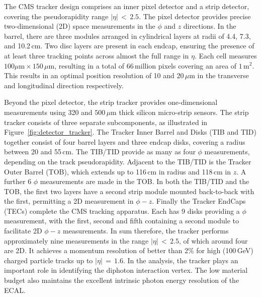 The CMS tracker design comprises an inner pixel detector and a strip detector, covering the pseudorapidity range $|\eta|\,<\,2.5$.
The pixel detector provides precise two-dimensional (2D) space measurements in the $\phi$ and $z$ directions.
In the barrel, there are three modules arranged in cylindrical layers at radii of 4.4, 7.3, and 10.2\,cm. 
Two disc layers are present in each endcap, ensuring the presence of at least three tracking points across almost the full range in $\eta$.
Each cell measures $100\mu\textrm{m}\times150\,\mu\textrm{m}$, resulting in a total of 66\,million pixels covering an area of $1\,\textrm{m}^2$.
This results in an optimal position resolution of 10 and $20\,\mu\textrm{m}$ in the transverse and longitudinal direction respectively.

Beyond the pixel detector, the strip tracker provides one-dimensional measurements using 320 and $500\,\mu\textrm{m}$ thick silicon micro-strip sensors.
The strip tracker consists of three separate subcomponents, as illustrated in Figure~\ref{fig:detector_tracker}.
The Tracker Inner Barrel and Disks (TIB and TID) together consist of four barrel layers and three endcap disks, covering a radius between 20 and 55\,cm. %
The TIB/TID provide as many as four $\phi$ measurements, depending on the track pseudorapidity.
Adjacent to the TIB/TID is the Tracker Outer Barrel (TOB), which extends up to 116\,cm in radius and 118\,cm in $z$.
A further 6 $\phi$ measurements are made in the TOB.
In both the TIB/TID and the TOB, the first two layers have a second strip module mounted back-to-back with the first, permitting a 2D measurement in $\phi-z$.
Finally the Tracker EndCaps (TECs) complete the CMS tracking apparatus.
Each has 9 disks providing a $\phi$ measurement, with the first, second and fifth containing a second module to facilitate 2D $\phi-z$ measurements.
In sum therefore, the tracker performs approximately nine measurements in the range $|\eta|\,<\,2.5$, of which around four are 2D.
It achieves a momentum resolution of better than 2\% for high \pt (100\,GeV) charged particle tracks up to $|\eta|\,=\,1.6$. %
In the \Hgg analysis, the tracker plays an important role in identifying the diphoton interaction vertex. %
The low material budget also maintains the excellent intrinsic photon energy resolution of the ECAL.

